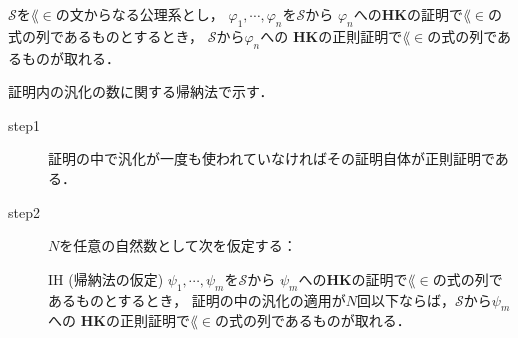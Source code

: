 	\begin{screen}
		\begin{metathm}[どんな証明も正則化できる]
		\label{metathm:regularization_of_HK_proof}
			$\mathscr{S}$を$\lang{\in}$の文からなる公理系とし，
			$\varphi_{1},\cdots,\varphi_{n}$を$\mathscr{S}$から
			$\varphi_{n}$への{\bf HK}の証明で$\lang{\in}$の式の列であるものとするとき，
			$\mathscr{S}$から$\varphi_{n}$への
			{\bf HK}の正則証明で$\lang{\in}$の式の列であるものが取れる．
		\end{metathm}
	\end{screen}
	
	\begin{metaprf}
		証明内の汎化の数に関する帰納法で示す．
		\begin{description}
			\item[step1] 証明の中で汎化が一度も使われていなければその証明自体が正則証明である．
				
			\item[step2] $N$を任意の自然数として次を仮定する：
				\begin{itembox}[l]{IH (帰納法の仮定)}
					$\psi_{1},\cdots,\psi_{m}$を$\mathscr{S}$から
					$\psi_{m}$への{\bf HK}の証明で$\lang{\in}$の式の列であるものとするとき，
					証明の中の汎化の適用が$N$回以下ならば，$\mathscr{S}$から$\psi_{m}$への
					{\bf HK}の正則証明で$\lang{\in}$の式の列であるものが取れる．
				\end{itembox}
				

\end{description}
\end{metaprf}
